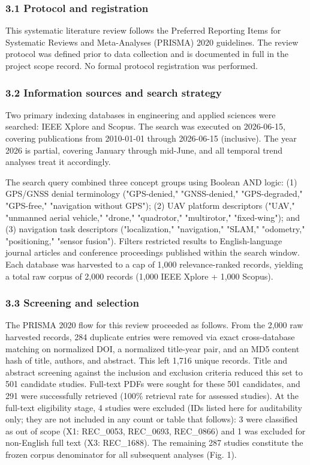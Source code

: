 \documentclass[conference]{IEEEtran}
\begin{document}
\subsubsection{3.1 Protocol and registration}


This systematic literature review follows the Preferred Reporting Items for Systematic Reviews and Meta-Analyses (PRISMA) 2020 guidelines. The review protocol was defined prior to data collection and is documented in full in the project scope record. No formal protocol registration was performed.


\subsubsection{3.2 Information sources and search strategy}


Two primary indexing databases in engineering and applied sciences were searched: IEEE Xplore and Scopus. The search was executed on 2026-06-15, covering publications from 2010-01-01 through 2026-06-15 (inclusive). The year 2026 is partial, covering January through mid-June, and all temporal trend analyses treat it accordingly.


The search query combined three concept groups using Boolean AND logic: (1) GPS/GNSS denial terminology ("GPS-denied," "GNSS-denied," "GPS-degraded," "GPS-free," "navigation without GPS"); (2) UAV platform descriptors ("UAV," "unmanned aerial vehicle," "drone," "quadrotor," "multirotor," "fixed-wing"); and (3) navigation task descriptors ("localization," "navigation," "SLAM," "odometry," "positioning," "sensor fusion"). Filters restricted results to English-language journal articles and conference proceedings published within the search window. Each database was harvested to a cap of 1,000 relevance-ranked records, yielding a total raw corpus of 2,000 records (1,000 IEEE Xplore + 1,000 Scopus).


\subsubsection{3.3 Screening and selection}


The PRISMA 2020 flow for this review proceeded as follows. From the 2,000 raw harvested records, 284 duplicate entries were removed via exact cross-database matching on normalized DOI, a normalized title-year pair, and an MD5 content hash of title, authors, and abstract. This left 1,716 unique records. Title and abstract screening against the inclusion and exclusion criteria reduced this set to 501 candidate studies. Full-text PDFs were sought for these 501 candidates, and 291 were successfully retrieved (100\% retrieval rate for assessed studies). At the full-text eligibility stage, 4 studies were excluded (IDs listed here for auditability only; they are not included in any count or table that follows): 3 were classified as out of scope (X1: REC\_0053, REC\_0693, REC\_0866) and 1 was excluded for non-English full text (X3: REC\_1688). The remaining 287 studies constitute the frozen corpus denominator for all subsequent analyses (Fig. 1).
\end{document}
